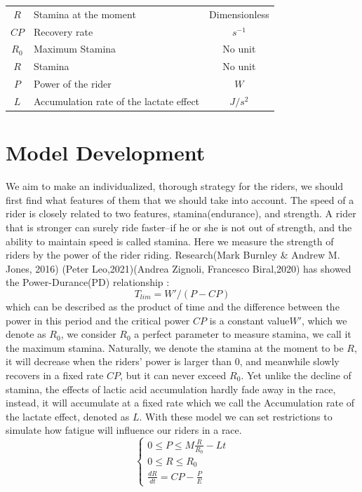 \documentclass[12pt]{article}
\begin{document}
\begin{center}
{\begin{tabular}{clc}
            $R$           & Stamina at the moment                                   & Dimensionless \\
            $CP$          & Recovery rate                                           & $s^{-1}$      \\
            $R_0$         & Maximum Stamina                                         & No unit       \\
            $R$           & Stamina                                                 & No unit       \\
            $P$           & Power of the rider                                      & $W$           \\
            $L$           & Accumulation rate of the lactate effect                 & $J/s^2$       \\
            \bottomrule
        \end{tabular}
    }
\end{center}
\section{Model Development}
We aim to make an individualized, thorough strategy for the riders, we should first find what features of them that we should take into account.
The speed of a rider
is closely related to two features, stamina(endurance), and strength. A rider that is stronger can surely ride faster--if he or she is not out of strength, and the ability
to maintain speed is called stamina.
Here we measure the strength of riders by the power of the rider riding. Research(Mark Burnley \& Andrew M. Jones, 2016)\cite{doi:10.1080/17461391.2016.1249524}
(Peter Leo,2021)\cite{leo2021power}(Andrea Zignoli, Francesco Biral,2020)\cite{zignoli2020prediction}%
has showed the Power-Durance(PD) relationship : $$T_{lim}=W'/(P-CP)$$
which can be described as the product of time and the difference between the power in this period and the critical power $CP$ is a constant value$W'$, which we
denote as $R_0$, we consider $R_0$ a perfect parameter to measure stamina, we call it the maximum stamina. Naturally, we denote the stamina at the moment to be $R$, it
will decrease when the riders' power is larger than 0, and meanwhile slowly recovers in a fixed rate $CP$,
but it can never exceed $R_0$. Yet unlike the decline of stamina, the effects of lactic acid accumulation hardly fade away in the race, instead,
it will accumulate at a fixed rate which we call the Accumulation rate of the lactate effect, denoted as $L$. With these model we can set restrictions
to simulate how fatigue will influence our riders in a race.
\begin{equation}
    \left\{
    \begin{array}{c}
        0                \leqslant  P  \leqslant  M\frac{R}{R_0}-Lt \\
        0                \leqslant  R  \leqslant  R_0               \\
        \frac{d R}{d t}=CP  -\frac{P}{E}%
    \end{array}
    \right.
\end{equation}
\end{document}
